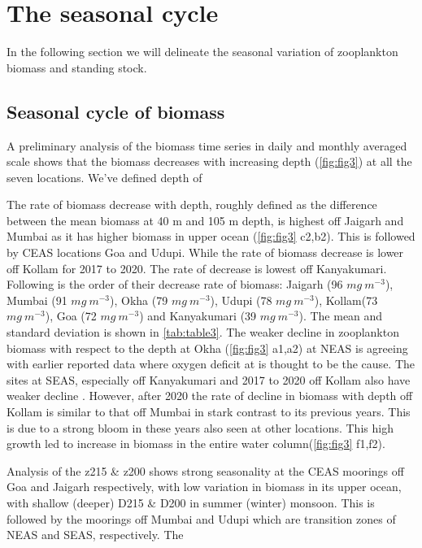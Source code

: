 \documentclass{article}
\begin{document}
	 
	 
	 
	\section{The seasonal cycle}
	In the following section we will delineate the seasonal variation of zooplankton biomass and standing stock.
	\subsection{Seasonal cycle of biomass}
	\label{sec:seasonalcycle}
	A preliminary analysis of the biomass time series in daily and monthly averaged scale shows that the biomass decreases with increasing depth (\cref{fig:fig3}) at all the seven locations. We've defined depth of 
	  
	The rate of biomass decrease with depth, roughly defined as the difference between the mean biomass at 40 m  and 105 m depth, is highest off Jaigarh and Mumbai as it has higher biomass in upper ocean (\cref{fig:fig3} c2,b2). This is followed by CEAS locations Goa and Udupi. While the rate of biomass decrease is lower off Kollam for 2017 to 2020. The rate of decrease is lowest off Kanyakumari. Following is the order of their decrease rate of biomass: Jaigarh (96 $mg\ m^{-3}$), Mumbai (91 $mg\ m^{-3}$), Okha (79 $mg\ m^{-3}$), Udupi (78 $mg\ m^{-3}$), Kollam(73 $mg\ m^{-3}$), Goa (72 $mg\ m^{-3}$) and Kanyakumari (39 $mg\ m^{-3}$).  The mean and standard deviation is shown in \autoref{tab:table3}. The weaker decline in zooplankton biomass with respect to the depth at Okha (\cref{fig:fig3} a1,a2) at NEAS is agreeing with earlier reported data \cite{madhupratap2001mesozooplankton,smith2005mesozooplankton,wishner1998mesozooplankton} where oxygen deficit at is thought to be the cause. The sites at SEAS, especially off Kanyakumari and 2017 to 2020 off Kollam also have weaker decline \citep{madhupratap2001mesozooplankton, aparna2022seasonal}. However, after 2020 the rate of decline in biomass with depth off Kollam is similar to that off Mumbai in stark contrast to its previous years. This is due to a strong bloom in these years also seen at other locations. This high growth led to increase in biomass in the entire water column(\cref{fig:fig3} f1,f2).
	 
	Analysis of the z215 \& z200 shows strong seasonality at the CEAS moorings off Goa and Jaigarh respectively, with low variation in biomass in its upper ocean, with shallow (deeper) D215 \& D200 in summer (winter) monsoon. This is followed by the moorings off Mumbai and Udupi which are transition zones of NEAS and SEAS, respectively. The 
	 
\end{document}
